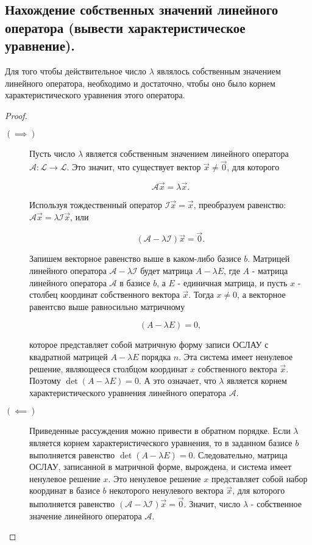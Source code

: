 \newpage


\subsection{
    Нахождение собственных значений линейного оператора (вывести характеристическое уравнение).
}

\begin{theorem}
    Для того чтобы действительное число $\lambda$ являлось собственным значением линейного оператора, необходимо и достаточно, чтобы оно было корнем характеристического уравнения этого оператора.
\end{theorem}

\begin{proof}~
    \begin{description}
        \item[$(\implies)$] 
            Пусть число $\lambda$ является собственным значением линейного оператора $\mathscr{A} \colon \mathcal{L} \to \mathcal{L}$. Это значит, что существует вектор $\vec{x} \ne \vec{0}$, для которого 

            $$\mathscr{A}\vec{x} = \lambda \vec{x}.$$

            Используя тождественный оператор $\mathscr{I}\vec{x} = \vec{x}$, преобразуем равенство: $\mathscr{A}\vec{x} = \lambda\mathscr{I}\vec{x}$, или
            
            $$(\mathscr{A} - \lambda\mathscr{I})\vec{x} = \vec{0}.$$

            Запишем векторное равенство выше в каком-либо базисе $b$. Матрицей линейного оператора $\mathscr{A} - \lambda\mathscr{I}$ будет матрица $A - \lambda E$, где $A$ - матрица линейного оператора $\mathscr{A}$ в базисе $b$, а $E$ - единичная матрица, и пусть $x$ - столбец координат собственного вектора $\vec{x}$. Тогда $x \ne 0$, а векторное равентсво выше равносильно матричному

            $$(A - \lambda E) = 0,$$

            которое представляет собой матричную форму записи ОСЛАУ с квадратной матрицей $A - \lambda E$ порядка $n$. Эта система имеет ненулевое решение, являющееся столбцом координат $x$ собственного вектора $\vec{x}$. Поэтому $\det(A - \lambda E) = 0$. А это означает, что $\lambda$ является корнем характеристического уравнения линейного оператора $\mathscr{A}$.
        \item[$(\impliedby)$]
            Приведенные рассуждения можно привести в обратном порядке. Если $\lambda$ является корнем характеристического уравнения, то в заданном базисе $b$ выполняется равенство $\det (A - \lambda E) = 0$. Следовательно, матрица ОСЛАУ, записанной в матричной форме, вырождена, и система имеет ненулевое решение $x$. Это ненулевое решение $x$ представляет собой набор координат в базисе $b$ некоторого ненулевого вектора $\vec{x}$, для которого выполняется равенство $(\mathscr{A} - \lambda\mathscr{I})\vec{x} = \vec{0}$. Значит, число $\lambda$ - собственное значение линейного оператора $\mathscr{A}$.
    \end{description}
\end{proof}



